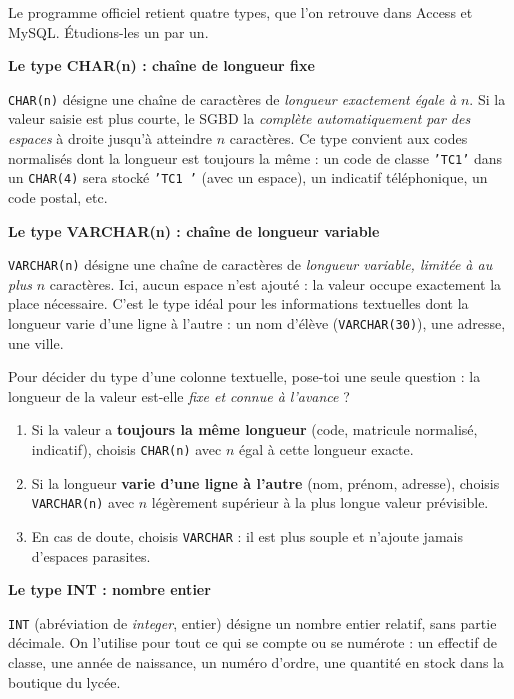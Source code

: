 \documentclass[11pt]{article}
\begin{document}
Le programme officiel retient quatre types, que l'on retrouve dans Access et MySQL. Étudions-les un par un.

\textbf{Le type CHAR(n) : chaîne de longueur fixe}\par
\texttt{CHAR(n)} désigne une chaîne de caractères de \emph{longueur exactement égale à} $n$. Si la valeur saisie est plus courte, le SGBD la \emph{complète automatiquement par des espaces} à droite jusqu'à atteindre $n$ caractères. Ce type convient aux codes normalisés dont la longueur est toujours la même : un code de classe \texttt{'TC1'} dans un \texttt{CHAR(4)} sera stocké \texttt{'TC1 '} (avec un espace), un indicatif téléphonique, un code postal, etc.

\textbf{Le type VARCHAR(n) : chaîne de longueur variable}\par
\texttt{VARCHAR(n)} désigne une chaîne de caractères de \emph{longueur variable, limitée à au plus} $n$ caractères. Ici, aucun espace n'est ajouté : la valeur occupe exactement la place nécessaire. C'est le type idéal pour les informations textuelles dont la longueur varie d'une ligne à l'autre : un nom d'élève (\texttt{VARCHAR(30)}), une adresse, une ville.

\begin{methode}
Pour décider du type d'une colonne textuelle, pose-toi une seule question : la longueur de la valeur est-elle \emph{fixe et connue à l'avance} ?
\begin{enumerate}
\item Si la valeur a \textbf{toujours la même longueur} (code, matricule normalisé, indicatif), choisis \texttt{CHAR(n)} avec $n$ égal à cette longueur exacte.
\item Si la longueur \textbf{varie d'une ligne à l'autre} (nom, prénom, adresse), choisis \texttt{VARCHAR(n)} avec $n$ légèrement supérieur à la plus longue valeur prévisible.
\item En cas de doute, choisis \texttt{VARCHAR} : il est plus souple et n'ajoute jamais d'espaces parasites.
\end{enumerate}
\end{methode}

\textbf{Le type INT : nombre entier}\par
\texttt{INT} (abréviation de \emph{integer}, entier) désigne un nombre entier relatif, sans partie décimale. On l'utilise pour tout ce qui se compte ou se numérote : un effectif de classe, une année de naissance, un numéro d'ordre, une quantité en stock dans la boutique du lycée.
\end{document}
